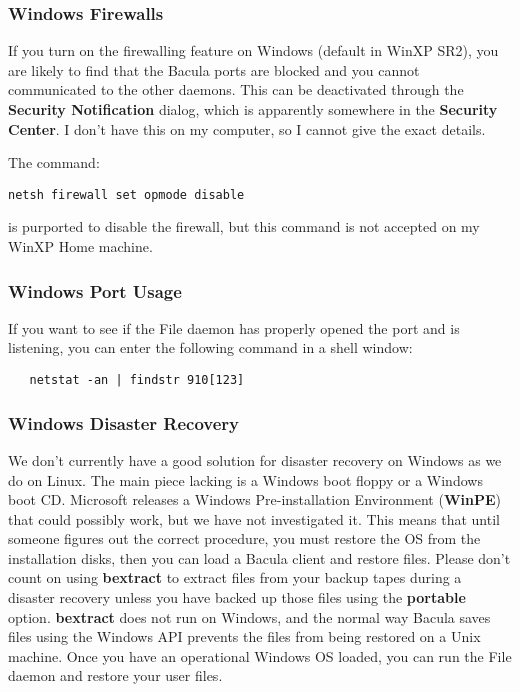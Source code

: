 \subsubsection*{Windows Firewalls}

If you turn on the firewalling feature on Windows (default in WinXP SR2), you
are likely to find that the Bacula ports are blocked and you cannot
communicated to the other daemons. This can be deactivated through the {\bf
Security Notification} dialog, which is apparently somewhere in the {\bf
Security Center}. I don't have this on my computer, so I cannot give the exact
details. 

The command: 

\footnotesize
\begin{verbatim}
netsh firewall set opmode disable
\end{verbatim}
\normalsize

is purported to disable the firewall, but this command is not accepted on my
WinXP Home machine. 

\subsubsection*{Windows Port Usage}

If you want to see if the File daemon has properly opened the port and is
listening, you can enter the following command in a shell window: 

\footnotesize
\begin{verbatim}
   netstat -an | findstr 910[123]
\end{verbatim}
\normalsize

\subsubsection*{Windows Disaster Recovery}

We don't currently have a good solution for disaster recovery on Windows as we
do on Linux. The main piece lacking is a Windows boot floppy or a Windows boot
CD. Microsoft releases a Windows Pre-installation Environment ({\bf WinPE})
that could possibly work, but we have not investigated it. This means that
until someone figures out the correct procedure, you must restore the OS from
the installation disks, then you can load a Bacula client and restore files.
Please don't count on using {\bf bextract} to extract files from your backup
tapes during a disaster recovery unless you have backed up those files using
the {\bf portable} option. {\bf bextract} does not run on Windows, and the
normal way Bacula saves files using the Windows API prevents the files from
being restored on a Unix machine. Once you have an operational Windows OS
loaded, you can run the File daemon and restore your user files. 

